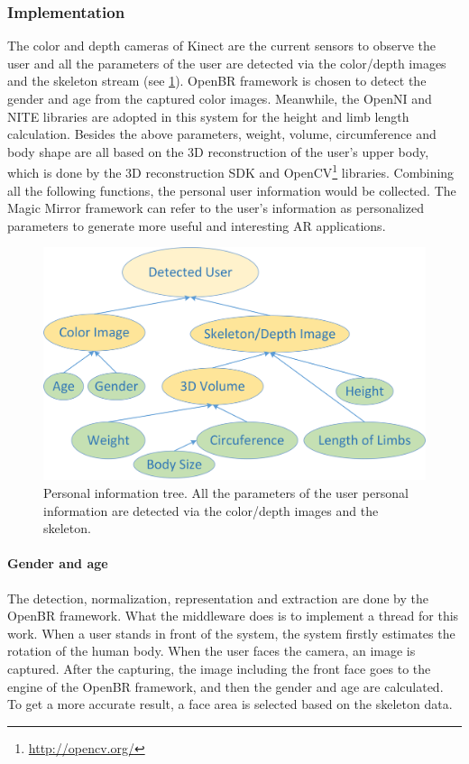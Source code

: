 \subsubsection{Implementation}
The color and depth cameras of Kinect are the current sensors to observe the user and all the parameters of the user are detected via the color/depth images and the skeleton stream (see \figurename{\ref{fig:3-PRMM:BiomatricInformation}}). OpenBR framework is chosen to detect the gender and age from the captured color images. Meanwhile, the OpenNI and NITE libraries are adopted in this system for the height and limb length calculation. Besides the above parameters, weight, volume, circumference and body shape are all based on the 3D reconstruction of the user's upper body, which is done by the 3D reconstruction SDK and OpenCV\footnote{\url{http://opencv.org/}} libraries.
Combining all the following functions, the personal user information would be collected. The Magic Mirror framework can refer to the user's information as personalized parameters to generate more useful and interesting AR applications.
\begin{figure}
	\centering
	\includegraphics[width=0.75\linewidth]{figures/3-PRMM/BiomatricInformation}
	\caption{Personal information tree. All the parameters of the user personal information are detected via the color/depth images and the skeleton.}
	\label{fig:3-PRMM:BiomatricInformation}
\end{figure}

\paragraph{Gender and age}
The detection, normalization, representation and extraction are done by the OpenBR framework. What the middleware does is to implement a thread for this work. When a user stands in front of the system, the system firstly estimates the rotation of the human body. When the user faces the camera, an image is captured.  After the capturing, the image including the front face goes to the engine of the OpenBR framework, and then the gender and age are calculated. To get a more accurate result, a face area is selected based on the skeleton data. 

